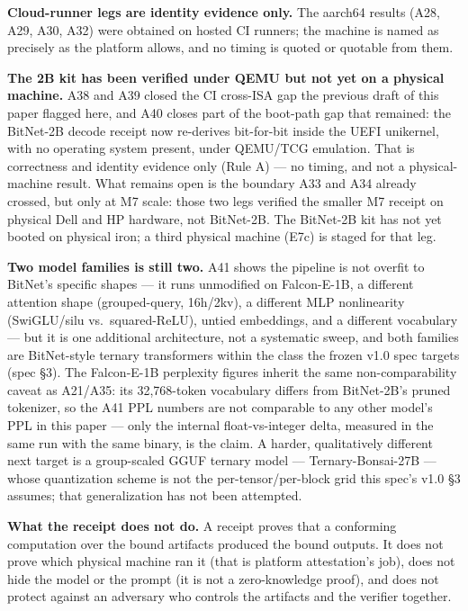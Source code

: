 \documentclass[11pt]{article}
\begin{document}
\textbf{Cloud-runner legs are identity evidence only.} The aarch64 results (A28, A29, A30, A32) were
obtained on hosted CI runners; the machine is named as precisely as the platform allows, and no
timing is quoted or quotable from them.

\textbf{The 2B kit has been verified under QEMU but not yet on a physical machine.} A38 and A39
closed the CI cross-ISA gap the previous draft of this paper flagged here, and A40 closes part of
the boot-path gap that remained: the BitNet-2B decode receipt now re-derives bit-for-bit inside the
UEFI unikernel, with no operating system present, under QEMU/TCG emulation. That is correctness and
identity evidence only (Rule A) --- no timing, and not a physical-machine result. What remains open
is the boundary A33 and A34 already crossed, but only at M7 scale: those two legs verified the
smaller M7 receipt on physical Dell and HP hardware, not BitNet-2B. The BitNet-2B kit has not yet
booted on physical iron; a third physical machine (E7c) is staged for that leg.

\textbf{Two model families is still two.} A41 shows the pipeline is not overfit to BitNet's specific
shapes --- it runs unmodified on Falcon-E-1B, a different attention shape (grouped-query, 16h/2kv),
a different MLP nonlinearity (SwiGLU/silu vs.~squared-ReLU), untied embeddings, and a different
vocabulary --- but it is one additional architecture, not a systematic sweep, and both families are
BitNet-style ternary transformers within the class the frozen v1.0 spec targets (spec §3). The
Falcon-E-1B perplexity figures inherit the same non-comparability caveat as A21/A35: its
32,768-token vocabulary differs from BitNet-2B's pruned tokenizer, so the A41 PPL numbers are not
comparable to any other model's PPL in this paper --- only the internal float-vs-integer delta,
measured in the same run with the same binary, is the claim. A harder, qualitatively different
next target is a group-scaled GGUF ternary model --- Ternary-Bonsai-27B --- whose quantization scheme
is not the per-tensor/per-block grid this spec's v1.0 §3 assumes; that generalization has not been
attempted.

\textbf{What the receipt does not do.} A receipt proves that a conforming computation over the bound
artifacts produced the bound outputs. It does not prove which physical machine ran it (that is
platform attestation's job), does not hide the model or the prompt (it is not a zero-knowledge
proof), and does not protect against an adversary who controls the artifacts and the verifier
together.
\end{document}
